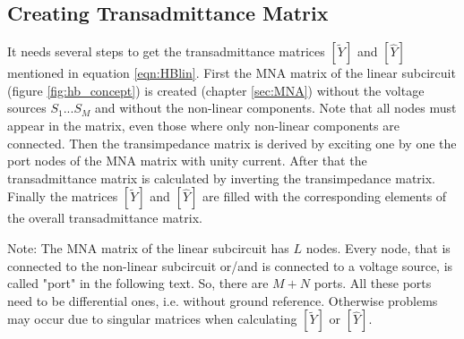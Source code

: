 \subsection{Creating Transadmittance Matrix}

It needs several steps to get the transadmittance matrices $[\tilde{Y}]$
and $[\hat{Y}]$ mentioned in equation \eqref{eqn:HBlin}. First the MNA
matrix of the linear subcircuit (figure \ref{fig:hb_concept}) is created
(chapter \ref{sec:MNA}) without the voltage sources $S_1$...$S_M$ and
without the non-linear components. Note that all nodes must appear in the
matrix, even those where only non-linear components are connected. Then
the transimpedance matrix is derived by
exciting one by one the port nodes of the MNA matrix with unity current.
After that the transadmittance matrix is calculated by inverting the
transimpedance matrix. Finally the matrices $[\tilde{Y}]$ and $[\hat{Y}]$
are filled with the corresponding elements of the overall transadmittance
matrix.

\addvspace{12pt}

Note: The MNA matrix of the linear subcircuit has $L$ nodes.
Every node, that is connected to the non-linear subcircuit or/and is
connected to a voltage source, is called "port" in the following text.
So, there are $M+N$ ports. All these ports need to be differential
ones, i.e. without ground reference. Otherwise problems may occur
due to singular matrices when calculating $[\tilde{Y}]$ or $[\hat{Y}]$.

\addvspace{12pt}

